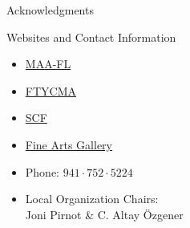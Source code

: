 \documentclass[final,hyperref={pdfpagelabels=false},12pt]{beamer}
\let\olditem\item
\renewcommand{\item}{\olditem\justifying}
\begin{document}
\begin{frame}[t]
\begin{columns}[t]
\begin{column}{.465\textwidth}
\begin{block}{Acknowledgments}
\end{block}



\begin{block}{Websites and Contact Information}

 \begin{minipage}[b]{0.45\linewidth}
 \begin{itemize}
\item  \href{http://sections.maa.org/florida/}{MAA-FL}
\item  \href{http://scf1.scf.edu/ftycma/default.htm}{FTYCMA}
\item \href{http://www.scf.edu/}{SCF}
\item  \href{http://www.scf.edu/Academics/FinePerformingArts/FineArtGallery/default.asp}{Fine Arts Gallery}
\end{itemize}
        \end{minipage}
        \hspace{0.5cm}
        \begin{minipage}[b]{0.45\linewidth}
       \begin{itemize}
\item Phone: $941\cdot 752\cdot 5224$
\item Local Organization Chairs:\\  Joni Pirnot \& C. Altay \"Ozgener 
\end{itemize}
        \end{minipage}



\end{block}


\end{column} %

\begin{column}{.015\textwidth}\end{column} %

\end{columns} %

\end{frame} %
\end{document}
